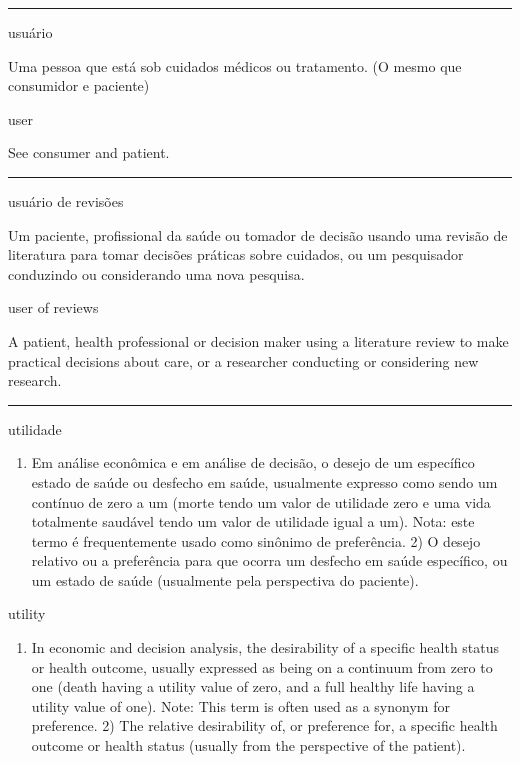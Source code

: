 \documentclass[
  openany]{book}
\providecommand{\tightlist}{%
  \setlength{\itemsep}{0pt}\setlength{\parskip}{0pt}}
\begin{document}
\begin{center}\rule{0.5\linewidth}{0.5pt}\end{center}

usuário

Uma pessoa que está sob cuidados médicos ou tratamento. (O mesmo que consumidor e paciente)

user

See consumer and patient.

\begin{center}\rule{0.5\linewidth}{0.5pt}\end{center}

usuário de revisões

Um paciente, profissional da saúde ou tomador de decisão usando uma revisão de literatura para tomar decisões práticas sobre cuidados, ou um pesquisador conduzindo ou considerando uma nova pesquisa.

user of reviews

A patient, health professional or decision maker using a literature review to make practical decisions about care, or a researcher conducting or considering new research.

\begin{center}\rule{0.5\linewidth}{0.5pt}\end{center}

utilidade

\begin{enumerate}
\def\labelenumi{\arabic{enumi})}
\tightlist
\item
  Em análise econômica e em análise de decisão, o desejo de um específico estado de saúde ou desfecho em saúde, usualmente expresso como sendo um contínuo de zero a um (morte tendo um valor de utilidade zero e uma vida totalmente saudável tendo um valor de utilidade igual a um). Nota: este termo é frequentemente usado como sinônimo de preferência. 2) O desejo relativo ou a preferência para que ocorra um desfecho em saúde específico, ou um estado de saúde (usualmente pela perspectiva do paciente).
\end{enumerate}

utility

\begin{enumerate}
\def\labelenumi{\arabic{enumi})}
\tightlist
\item
  In economic and decision analysis, the desirability of a specific health status or health outcome, usually expressed as being on a continuum from zero to one (death having a utility value of zero, and a full healthy life having a utility value of one). Note: This term is often used as a synonym for preference. 2) The relative desirability of, or preference for, a specific health outcome or health status (usually from the perspective of the patient).
\end{enumerate}
\end{document}
